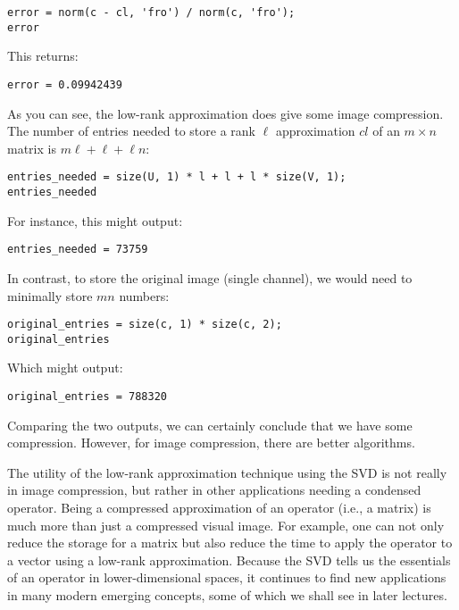 \documentclass{ximera}
\begin{document}
\begin{problem}
\begin{verbatim}
error = norm(c - cl, 'fro') / norm(c, 'fro');
error
\end{verbatim}

This returns:

\begin{verbatim}
error = 0.09942439
\end{verbatim}

As you can see, the low-rank approximation does give some image compression. The number of entries needed to store a rank \( \ell \) approximation \( cl \) of an \( m \times n \) matrix is \( m\ell + \ell + \ell n \):

\begin{verbatim}
entries_needed = size(U, 1) * l + l + l * size(V, 1);
entries_needed
\end{verbatim}

For instance, this might output:

\begin{verbatim}
entries_needed = 73759
\end{verbatim}

In contrast, to store the original image (single channel), we would need to minimally store \( mn \) numbers:

\begin{verbatim}
original_entries = size(c, 1) * size(c, 2);
original_entries
\end{verbatim}

Which might output:

\begin{verbatim}
original_entries = 788320
\end{verbatim}

Comparing the two outputs, we can certainly conclude that we have some compression. However, for image compression, there are better algorithms.

The utility of the low-rank approximation technique using the SVD is not really in image compression, but rather in other applications needing a condensed operator. Being a compressed approximation of an operator (i.e., a matrix) is much more than just a compressed visual image. For example, one can not only reduce the storage for a matrix but also reduce the time to apply the operator to a vector using a low-rank approximation. Because the SVD tells us the essentials of an operator in lower-dimensional spaces, it continues to find new applications in many modern emerging concepts, some of which we shall see in later lectures.
 

\end{problem}
\end{document}
